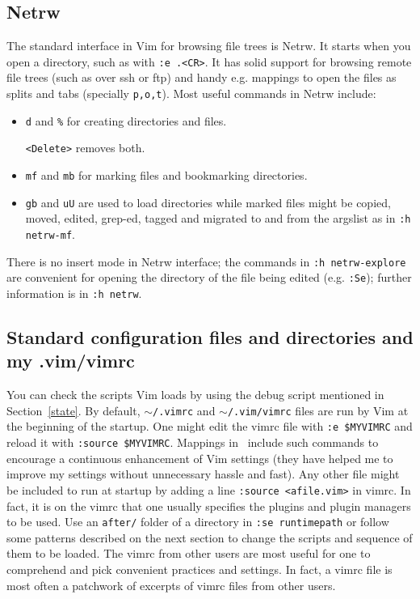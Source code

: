 \documentclass{article}
\newcommand{\ttt}[1] {
	\texttt{<#1>}}
\newcommand{\tttt}[1]{\texttt{#1}}
\begin{document}
\subsection{Netrw}\label{netrw}
The standard interface in Vim for browsing file trees is Netrw.
It starts when you open a directory, such as with \tttt{:e .<CR>}.
It has solid support for browsing remote file trees (such as over ssh or
ftp) and handy e.g. mappings to open the files as splits and tabs
(specially \tttt{p,o,t}).
Most useful commands in Netrw include:
\begin{itemize}
  \item \tttt{d} and \tttt{\%} for creating directories and files.
    \ttt{Delete} removes both.
  \item \tttt{mf} and \tttt{mb} for marking files and bookmarking directories.
  \item \tttt{gb} and \tttt{uU} are used to load directories
    while marked files might be copied, moved, edited, grep-ed, tagged and migrated
    to and from the argslist as in \tttt{:h netrw-mf}.
\end{itemize}

There is no insert mode in Netrw interface;
the commands in \tttt{:h netrw-explore} are
convenient for opening the directory of the
file being edited (e.g. \tttt{:Se});
further information is in \tttt{:h netrw}.

\subsection{Standard configuration files and directories and my .vim/vimrc}
You can check the scripts Vim loads by using the debug script mentioned
in Section~\ref{state}.
By default, \tttt{$\sim$/.vimrc} and \tttt{$\sim$/.vim/vimrc} files are run by Vim at the beginning of the startup.
One might edit the vimrc file with \tttt{:e \$MYVIMRC}
and reload it with \tttt{:source \$MYVIMRC}.
Mappings in~\cite{vimrc} include such commands
to encourage a continuous enhancement of Vim settings
(they have helped me to improve my settings without unnecessary 
hassle and fast).
Any other file might be included to run at startup by
adding a line \tttt{:source <afile.vim>} in vimrc.
In fact, it is on the vimrc that one usually specifies the plugins
and plugin managers to be used.
Use an \tttt{after/} folder of a directory in \tttt{:se runtimepath}
or follow some patterns described on the next section to change the
scripts and sequence of them to be loaded.
The vimrc from other users are most useful for one to comprehend
and pick convenient practices and settings.
In fact, a vimrc file is most often a patchwork of excerpts of vimrc
files from other users.
\end{document}
